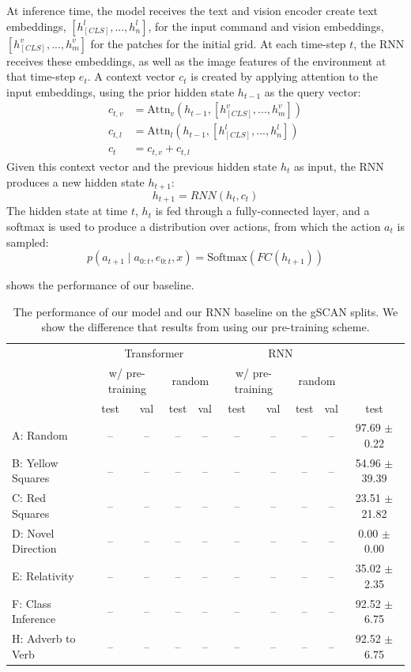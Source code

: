 \documentclass[11pt]{article}
\begin{document}
%
At inference time, the model receives the text and vision encoder create text embeddings, $[h_{[CLS]}^{l},...,h_{n}^{l}]$, for the input command and vision embeddings, $[h_{[CLS]}^{v},...,h_{m}^{v}]$ for the patches for the initial grid.
%
At each time-step $t$, the RNN receives these embeddings, as well as the image features of the environment at that time-step $e_t$.
%
A context vector $c_t$ is created by applying attention to the input embeddings, using the prior hidden state $h_{t-1}$ as the query vector:
\begin{align*}
c_{t,v} &= \text{Attn}_v(h_{t-1}, [h_{[CLS]}^{v},...,h_{m}^{v}])\\
c_{t,l} &= \text{Attn}_l(h_{t-1}, [h_{[CLS]}^{l},...,h_{n}^{l}])\\
c_t &= c_{t,v} + c_{t,l}
\end{align*}
Given this context vector and the previous hidden state $h_{t}$ as input, the RNN produces a new hidden state $h_{t+1}$:
$$
h_{t+1} = RNN(h_t, c_t)
$$
The hidden state at time $t$, $h_t$ is fed through a fully-connected layer, and a softmax is used to produce a distribution over actions, from which the action $a_t$ is sampled:
$$
p(a_{t+1} \mid a_{0:t}, e_{0:t}, x) = \text{Softmax}(FC(h_{t+1}))
$$
%

 shows the performance of our baseline.

\begin{table}
\begin{center}
\begin{tabularx}{\textwidth}{ l|ccccccccc }
\toprule
\multicolumn{1}{c}{} 
& \multicolumn{4}{c}{Transformer}  
& \multicolumn{4}{c}{RNN}  
& \\
\cmidrule{3-4}
\cmidrule{7-8}
\multicolumn{1}{c}{} 
& \multicolumn{2}{c}{w/ pre-training}  
& \multicolumn{2}{c}{random}
& \multicolumn{2}{c}{w/ pre-training}  
& \multicolumn{2}{c}{random}
& \multicolumn{1}{c}{\cite{ruis2020benchmark}}\\
& test  & val  & test &  val & test &  val & test & val & test  \\
\midrule
A: Random & --  & --  & -- &  -- & -- &  -- & -- &  -- & 97.69 $\pm$ 0.22\\
B: Yellow Squares & --  & --  & -- &  -- & -- &  -- & -- &  -- &  54.96 $\pm$ 39.39\\
C: Red Squares & --  & --  & -- &  -- & -- &  -- & -- &  -- & 23.51 $\pm$ 21.82\\
D: Novel Direction & --  & --  & -- & -- & -- &  -- & -- &  -- & 0.00 $\pm$ 0.00 \\
E: Relativity & --  & --  & -- & -- & -- &  -- & -- &  -- & 35.02 $\pm$ 2.35 \\
F: Class Inference & --  & --  & -- &  -- &-- &  -- & -- &  -- &  92.52 $\pm$ 6.75 \\
H: Adverb to Verb & --  & --  & -- &  -- &-- &  -- & -- &  -- &  92.52 $\pm$ 6.75 \\
\bottomrule
\end{tabularx}
\end{center}
\caption{The performance of our model and our RNN baseline on the gSCAN splits. We show the difference that results from using our pre-training scheme.}
\label{tab:gscan_results}
\end{table}
\end{document}
